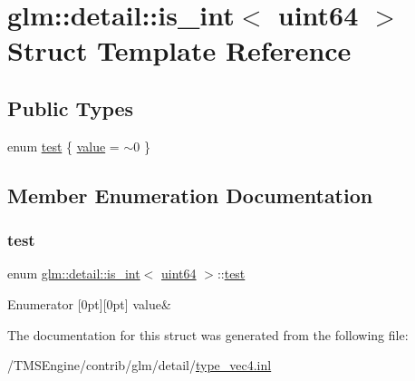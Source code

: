 \hypertarget{structglm_1_1detail_1_1is__int_3_01uint64_01_4}{}\section{glm\+:\+:detail\+:\+:is\+\_\+int$<$ uint64 $>$ Struct Template Reference}
\label{structglm_1_1detail_1_1is__int_3_01uint64_01_4}
\subsection*{Public Types}
\begin{DoxyCompactItemize}
\item 
enum \hyperlink{structglm_1_1detail_1_1is__int_3_01uint64_01_4_a8be9e204582a6cf6049dac4a685cb868}{test} \{ \hyperlink{structglm_1_1detail_1_1is__int_3_01uint64_01_4_a8be9e204582a6cf6049dac4a685cb868a78866d286f2c5661c099f47ae16450cc}{value} = $\sim$0
 \}
\end{DoxyCompactItemize}


\subsection{Member Enumeration Documentation}
\mbox{\label{structglm_1_1detail_1_1is__int_3_01uint64_01_4_a8be9e204582a6cf6049dac4a685cb868}} 
\subsubsection{\texorpdfstring{test}{test}}
{\footnotesize\ttfamily enum \hyperlink{structglm_1_1detail_1_1is__int}{glm\+::detail\+::is\+\_\+int}$<$ \hyperlink{namespaceglm_1_1detail_adec4b19bf4982125e122db2fe03c5810}{uint64} $>$\+::\hyperlink{structglm_1_1detail_1_1is__int_3_01uint64_01_4_a8be9e204582a6cf6049dac4a685cb868}{test}}

\begin{DoxyEnumFields}{Enumerator}
[0pt][0pt]{}\mbox{\label{structglm_1_1detail_1_1is__int_3_01uint64_01_4_a8be9e204582a6cf6049dac4a685cb868a78866d286f2c5661c099f47ae16450cc}} 
value&\\
\hline

\end{DoxyEnumFields}


The documentation for this struct was generated from the following file\+:\begin{DoxyCompactItemize}
\item 
/\+T\+M\+S\+Engine/contrib/glm/detail/\hyperlink{type__vec4_8inl}{type\+\_\+vec4.\+inl}\end{DoxyCompactItemize}
